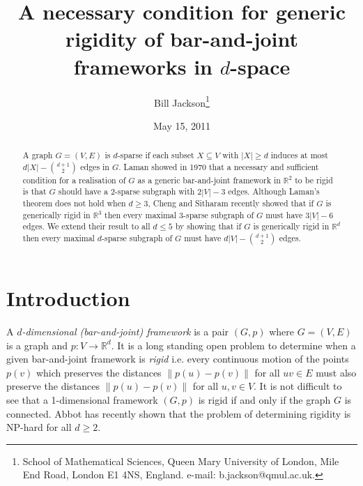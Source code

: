 \documentclass[11pt]{article}
\begin{document}
\newtheorem{theorem}{Theorem}  [section]
\newtheorem{proposition}[theorem]{Proposition}
\newtheorem{lemma}[theorem]{Lemma}
\newtheorem{claim}[theorem]{Claim}
\newtheorem{corollary}[theorem]{Corollary}
\newtheorem{fact}[theorem]{Fact}
\newtheorem{defn}[theorem]{Definition}
\newtheorem{conj}[theorem]{Conjecture}

\newcommand{\bproof}{\noindent{\bf Proof: }}
\newcommand{\eproof}{\hfill $\bullet$\\}
\newcommand{\de}{\mbox{def}}
\newcommand{\cee}{{\mathbb C}}
\newcommand{\real}{{\mathbb R}}
\newcommand{\rat}{{\mathbb Q}}
\newcommand{\zed}{{\mathbb Z}}
\newcommand{\calx}{{\cal X}}
\newcommand{\tran}{{{td}}}
\newcommand{\rank}{{\mbox{rank }}}
\newcommand{\sm}{\setminus}

\title{A necessary condition for generic rigidity of bar-and-joint frameworks in $d$-space}



\author{Bill Jackson\thanks{School of Mathematical Sciences,
 Queen Mary University of London,
Mile End Road, London E1 4NS, England. e-mail:
b.jackson@qmul.ac.uk. }
}

\date{May 15, 2011}

\maketitle

\begin{abstract}
A graph $G=(V,E)$ is {$d$-sparse} if each subset $X\subseteq V$ with
$|X|\geq d$ induces at most $d|X|-{{d+1}\choose{2}}$ edges in $G$.
Laman showed in 1970 that a necessary and sufficient condition for a
realisation of $G$ as a generic bar-and-joint framework in $\real^2$
to be rigid is that $G$ should have a 2-sparse subgraph with
$2|V|-3$ edges. Although Laman's theorem does not hold when $d\geq
3$, Cheng and Sitharam recently showed that if $G$ is generically
rigid in $\real^3$ then every maximal $3$-sparse subgraph of $G$
must have $3|V|-6$ edges. We extend their result to all $d\leq 5$ by
showing that if $G$ is generically rigid in $\real^d$ then every
maximal $d$-sparse subgraph of $G$ must have
$d|V|-{{d+1}\choose{2}}$ edges.
\end{abstract}

\section{Introduction}
A {\em $d$-dimensional (bar-and-joint) framework} is a pair $(G,p)$
where $G=(V,E)$ is a graph and $p:V\to \real^d$. It is a long
standing open problem to determine when a given bar-and-joint
framework is {\em rigid} i.e. every continuous motion of the points
$p(v)$ which preserves the distances $\|p(u)-p(v)\|$ for all $uv\in
E$ must also preserve the distances $\|p(u)-p(v)\|$ for all $u,v\in
V$. It is not difficult to see that a 1-dimensional framework
$(G,p)$ is rigid if and only if the graph $G$ is connected. Abbot
\cite{A} has recently shown that the problem of determining rigidity
is NP-hard for all $d\geq 2$.
\end{document}
